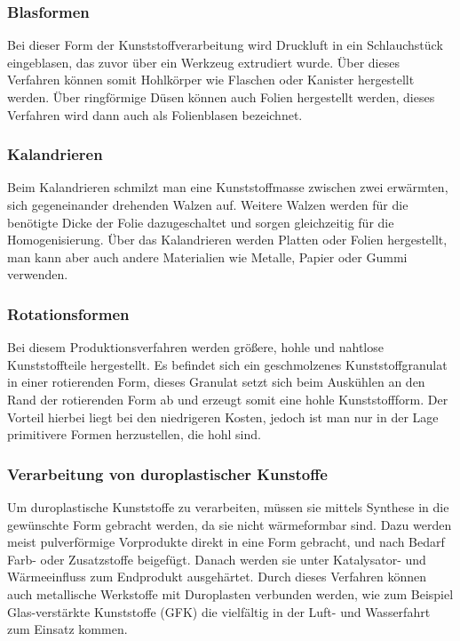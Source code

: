 \subsubsection{Blasformen}
Bei dieser Form der Kunststoffverarbeitung wird Druckluft in ein Schlauchstück eingeblasen, das zuvor über ein Werkzeug
extrudiert wurde. Über dieses Verfahren können somit Hohlkörper wie Flaschen oder Kanister hergestellt werden.
Über ringförmige Düsen können auch Folien hergestellt werden, dieses Verfahren wird dann auch als Folienblasen bezeichnet.

\subsubsection{Kalandrieren}
Beim Kalandrieren schmilzt man eine Kunststoffmasse zwischen zwei erwärmten, sich gegeneinander drehenden Walzen auf.
Weitere Walzen werden für die benötigte Dicke der Folie dazugeschaltet und sorgen gleichzeitig für die Homogenisierung.
Über das Kalandrieren werden Platten oder Folien hergestellt, man kann aber auch andere Materialien wie Metalle, Papier
oder Gummi verwenden.

\subsubsection{Rotationsformen}
Bei diesem Produktionsverfahren werden größere, hohle und nahtlose Kunststoffteile hergestellt. Es befindet sich
ein geschmolzenes Kunststoffgranulat in einer rotierenden Form, dieses Granulat setzt sich beim Auskühlen an den
Rand der rotierenden Form ab und erzeugt somit eine hohle Kunststoffform.
Der Vorteil hierbei liegt bei den niedrigeren Kosten, jedoch ist man nur in der Lage primitivere Formen herzustellen,
die hohl sind.

\subsubsection{Verarbeitung von duroplastischer Kunstoffe}
Um duroplastische Kunststoffe zu verarbeiten, müssen sie mittels Synthese in die gewünschte Form gebracht werden, da sie
nicht wärmeformbar sind. Dazu werden meist pulverförmige Vorprodukte direkt in eine Form gebracht, und nach Bedarf
Farb- oder Zusatzstoffe beigefügt. Danach werden sie unter Katalysator- und Wärmeeinfluss zum Endprodukt ausgehärtet.
Durch dieses Verfahren können auch metallische Werkstoffe mit Duroplasten verbunden werden, wie zum Beispiel
Glas-verstärkte Kunststoffe (GFK) die vielfältig in der Luft- und Wasserfahrt zum Einsatz kommen.

